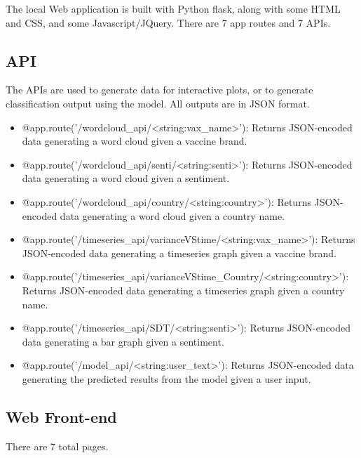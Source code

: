 \documentclass{article}
\begin{document}
The local Web application is built with Python flask, along with some HTML and CSS, and some Javascript/JQuery. There are 7 app routes and 7 APIs.

\subsection{API}
The APIs are used to generate data for interactive plots, or to generate classification output using the model. All outputs are in JSON format.

\begin{itemize}
    \item @app.route('/wordcloud\_api/\textless string:vax\_name\textgreater'): Returns JSON-encoded data generating a word cloud given a vaccine brand.
    \item @app.route('/wordcloud\_api/senti/\textless string:senti\textgreater'): Returns JSON-encoded data generating a word cloud given a sentiment.
    \item @app.route('/wordcloud\_api/country/\textless string:country\textgreater'): Returns JSON-encoded data generating a word cloud given a country name.
    \item @app.route('/timeseries\_api/varianceVStime/\textless string:vax\_name\textgreater'): Returns JSON-encoded data generating a timeseries graph given a vaccine brand.
    \item @app.route('/timeseries\_api/varianceVStime\_Country/\textless string:country\textgreater'): Returns JSON-encoded data generating a timeseries graph given a country name.
    \item @app.route('/timeseries\_api/SDT/\textless string:senti\textgreater'): Returns JSON-encoded data generating a bar graph given a sentiment.
    \item @app.route('/model\_api/\textless string:user\_text\textgreater'): Returns JSON-encoded data generating the predicted results from the model given a user input.
\end{itemize}

\subsection{Web Front-end}
There are 7 total pages.
\end{document}
